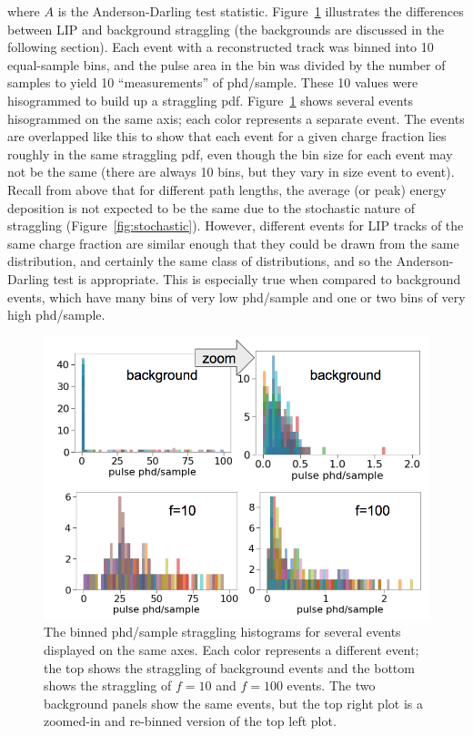 where $A$ is the Anderson-Darling test statistic. Figure~\ref{fig:energy_distribution_lip_bkg} illustrates the differences between \ac{LIP} and background straggling (the backgrounds are discussed in the following section). Each event with a reconstructed track was binned into 10 equal-sample bins, and the pulse area in the bin was divided by the number of samples to yield 10 ``measurements'' of phd/sample. These 10 values were hisogrammed to build up a straggling \ac{pdf}.  Figure~\ref{fig:energy_distribution_lip_bkg} shows several events hisogrammed on the same axis; each color represents a separate event. The events are overlapped like this to show that each event for a given charge fraction lies roughly in the same straggling \ac{pdf}, even though the bin size for each event may not be the same (there are always 10 bins, but they vary in size event to event). Recall from above that for different path lengths, the average (or peak) energy deposition is not expected to be the same due to the stochastic nature of straggling (Figure~\ref{fig:stochastic}). However, different events for \ac{LIP} tracks of the same charge fraction are similar enough that they could be drawn from the same distribution, and certainly the same class of distributions, and so the Anderson-Darling test is appropriate. This is especially true when compared to background events, which have many bins of very low phd/sample and one or two bins of very high phd/sample. 

\begin{figure}[htbp]
\begin{center}
\includegraphics[width=\textwidth]{figures/lips/energy_distribution_lip_bkg.png}
\caption{The binned phd/sample straggling histograms for several events displayed on the same axes. Each color represents a different event; the top shows the straggling of background events and the bottom shows the straggling of $f=10$ and $f=100$ events. The two background panels show the same events, but the top right plot is a zoomed-in and re-binned version of the top left plot. }
\label{fig:energy_distribution_lip_bkg}
\end{center}
\end{figure}

